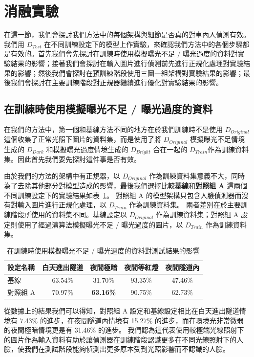 \section{消融實驗}

在這一節，我們會探討我們方法中的每個架構與細節是否真的對車內人偵測有效。我們用 $D_{Test}$ 在不同訓練設定下的模型上作實驗，來確認我們方法中的各個步驟都是有效的。首先我們會先探討在訓練時使用模擬曝光不足 / 曝光過度的資料對實驗結果的影響；接著我們會探討在輸入圖片進行偵測前先進行正規化處理對實驗結果的影響；然後我們會探討在預訓練階段使用三圖一組架構對實驗結果的影響；最後我們會探討在主要訓練階段對正規器繼續進行優化對實驗結果的影響。

\subsection{在訓練時使用模擬曝光不足 / 曝光過度的資料}

在我們的方法中，第一個和基線方法不同的地方在於我們訓練時不是使用 $D_{Original}$ 這個收集了正常光照下圖片的資料集，而是使用了將 $D_{Original}$ 模擬曝光不足情境生成的 $D_{Dark}$ 和模擬曝光過度情境生成的 $D_{Bright}$ 合在一起的 $D_{Train}$作為訓練資料集。因此首先我們要先探討這件事是否有效。

由於我們的方法的架構中有正規器，以 $D_{Original}$ 作為訓練資料集意義不大，同時為了去除其他部分對模型造成的影響，最後我們選擇比較\textbf{基線}和\textbf{對照組 A} 這兩個不同訓練設定下的實驗結果如表~\ref{table:data_compare}。
對照組 A 的模型架構只包含人臉偵測器而沒有對輸入圖片進行正規化處理，以 $D_{Train}$ 作為訓練資料集。
兩者差別在於主要訓練階段所使用的資料集不同。基線設定以 $D_{Original}$ 作為訓練資料集；對照組 A 設定則使用了經過演算法模擬曝光不足 / 曝光過度的圖片，以 $D_{Train}$ 作為訓練資料集。

\begin{table}[ht]
    \caption{在訓練時使用模擬曝光不足 / 曝光過度的資料對測試結果的影響}
    \centering
    \begin{tabular}{l c c c c}
        \hline
        設定名稱 & 白天進出隧道 & 夜間極暗 & 夜間等紅燈 & 夜間隧道內 \\
        \hline
        基線 & 63.54\% & 31.70\% & 93.35\% & 47.46\% \\
        對照組 A & 70.97\% & \textbf{63.16\%} & 90.75\% & 62.73\% \\
        \hline
    \end{tabular}
    \label{table:data_compare}
\end{table}

從數據上的結果我們可以得知，對照組 A 設定和基線設定相比在白天進出隧道情境有 7.43\% 的進步，在夜間隧道內情境有 15.27\% 的進步，而在環境光非常微弱的夜間極暗情境更是有 31.46\% 的進步。
我們認為這代表使用較極端光線照射下的圖片作為輸入資料有助於讓偵測器在訓練階段認識更多在不同光線照射下的人臉，使我們在測試階段能夠偵測出更多原本受到光照影響而不認識的人臉。

